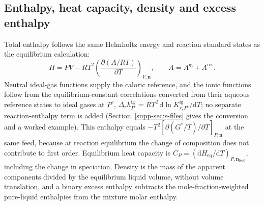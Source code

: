 
\subsection{Enthalpy, heat capacity, density and excess enthalpy}\label{sec:caloric-model}
Total enthalpy follows the same Helmholtz energy and reaction standard states as the equilibrium calculation:
\begin{equation}
 H=PV-RT^2\left(\frac{\partial(A/RT)}{\partial T}\right)_{V,\boldsymbol n},\qquad
 A=A^{\mathrm{ig}}+A^{\mathrm{res}}.
 \label{eq:total-enthalpy}
\end{equation}
Neutral ideal-gas functions supply the caloric reference, and the ionic functions follow from the equilibrium-constant correlations converted from their aqueous reference states to ideal gases at $P^\circ$, $\Delta_rh_{P^\circ}^{\mathrm{ig}}=RT^2\,\mathrm{d}\ln K_{r,P^\circ}^{\mathrm{ig}}/\mathrm{d}T$; no separate reaction-enthalpy term is added (Section~\ref{supp-sec:s-files} gives the conversion and a worked example).
This enthalpy equals $-T^2[\partial(G^*/T)/\partial T]_{P,\boldsymbol n}$ at the same feed, because at reaction equilibrium the change of composition does not contribute to first order.
Equilibrium heat capacity is $C_P=(\mathrm{d}H_{\mathrm{eq}}/\mathrm{d}T)_{P,\boldsymbol n_{\mathrm{feed}}}$, including the change in speciation.
Density is the mass of the apparent components divided by the equilibrium liquid volume, without volume translation, and a binary excess enthalpy subtracts the mole-fraction-weighted pure-liquid enthalpies from the mixture molar enthalpy.
